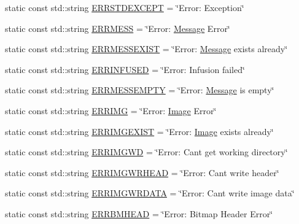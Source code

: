 \begin{DoxyCompactItemize}
static const std\+::string \mbox{\hyperlink{classErrorHandler_ae554a9167e1821ba8b49fc3e0bad3288}{E\+R\+R\+S\+T\+D\+E\+X\+C\+E\+PT}} = \char`\"{}Error\+: Exception\char`\"{}
\item 
static const std\+::string \mbox{\hyperlink{classErrorHandler_a921789ddcecc00b88f61b58d8adeae3e}{E\+R\+R\+M\+E\+SS}} = \char`\"{}Error\+: \mbox{\hyperlink{classMessage}{Message}} Error\char`\"{}
\item 
static const std\+::string \mbox{\hyperlink{classErrorHandler_a8abcac399b5014dad5f8d728298489e3}{E\+R\+R\+M\+E\+S\+S\+E\+X\+I\+ST}} = \char`\"{}Error\+: \mbox{\hyperlink{classMessage}{Message}} exists already\char`\"{}
\item 
static const std\+::string \mbox{\hyperlink{classErrorHandler_a8ee302ac7c97c484eb90c8e08fad3749}{E\+R\+R\+I\+N\+F\+U\+S\+ED}} = \char`\"{}Error\+: Infusion failed\char`\"{}
\item 
static const std\+::string \mbox{\hyperlink{classErrorHandler_a28d8ef2ee23112d4895dd60788c1b152}{E\+R\+R\+M\+E\+S\+S\+E\+M\+P\+TY}} = \char`\"{}Error\+: \mbox{\hyperlink{classMessage}{Message}} is empty\char`\"{}
\item 
static const std\+::string \mbox{\hyperlink{classErrorHandler_a0e6e270374c8c2d2bf1cf3525e2b185b}{E\+R\+R\+I\+MG}} = \char`\"{}Error\+: \mbox{\hyperlink{classImage}{Image}} Error\char`\"{}
\item 
static const std\+::string \mbox{\hyperlink{classErrorHandler_a32d9d3b8749844fa07ce891edea63286}{E\+R\+R\+I\+M\+G\+E\+X\+I\+ST}} = \char`\"{}Error\+: \mbox{\hyperlink{classImage}{Image}} exists already\char`\"{}
\item 
static const std\+::string \mbox{\hyperlink{classErrorHandler_adf275e9080935450d46748424c788efa}{E\+R\+R\+I\+M\+G\+WD}} = \char`\"{}Error\+: Can\textquotesingle{}t get working directory\char`\"{}
\item 
static const std\+::string \mbox{\hyperlink{classErrorHandler_aaacdfc33d32a1f97a8a2704512fa4436}{E\+R\+R\+I\+M\+G\+W\+R\+H\+E\+AD}} = \char`\"{}Error\+: Can\textquotesingle{}t write header\char`\"{}
\item 
static const std\+::string \mbox{\hyperlink{classErrorHandler_afc2c1377f8cee14dac495c98323b02f1}{E\+R\+R\+I\+M\+G\+W\+R\+D\+A\+TA}} = \char`\"{}Error\+: Can\textquotesingle{}t write image data\char`\"{}
\item 
static const std\+::string \mbox{\hyperlink{classErrorHandler_ace09849c636b0d6692e5437dfd3fb099}{E\+R\+R\+B\+M\+H\+E\+AD}} = \char`\"{}Error\+: Bitmap Header Error\char`\"{}

\end{DoxyCompactItemize}
